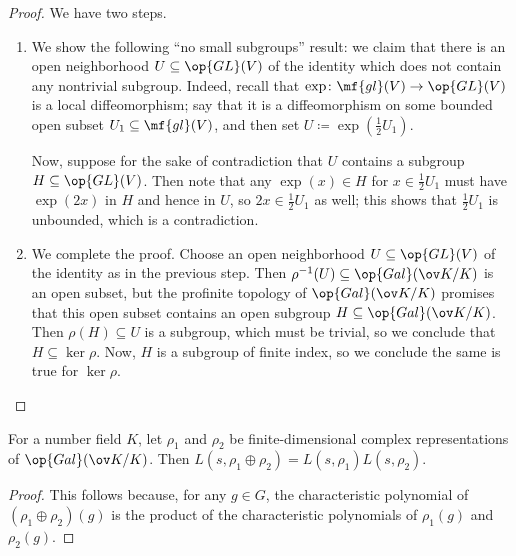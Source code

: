\documentclass[../thesis.tex]{subfiles}
\begin{document}
\begin{proof}
	We have two steps.
	\begin{enumerate}
		\item We show the following ``no small subgroups'' result: we claim that there is an open neighborhood $U\subseteq\op{GL}(V)$ of the identity which does not contain any nontrivial subgroup. Indeed, recall that $\exp\colon\mf{gl}(V)\to\op{GL}(V)$ is a local diffeomorphism; say that it is a diffeomorphism on some bounded open subset $U_1\subseteq\mf{gl}(V)$, and then set $U\coloneqq\exp\left(\frac12U_1\right)$.
		
		Now, suppose for the sake of contradiction that $U$ contains a subgroup $H\subseteq\op{GL}(V)$. Then note that any $\exp(x)\in H$ for $x\in\frac12U_1$ must have $\exp(2x)$ in $H$ and hence in $U$, so $2x\in\frac12U_1$ as well; this shows that $\frac12U_1$ is unbounded, which is a contradiction.

		\item We complete the proof. Choose an open neighborhood $U\subseteq\op{GL}(V)$ of the identity as in the previous step. Then $\rho^{-1}(U)\subseteq\op{Gal}(\ov K/K)$ is an open subset, but the profinite topology of $\op{Gal}(\ov K/K)$ promises that this open subset contains an open subgroup $H\subseteq\op{Gal}(\ov K/K)$. Then $\rho(H)\subseteq U$ is a subgroup, which must be trivial, so we conclude that $H\subseteq\ker\rho$. Now, $H$ is a subgroup of finite index, so we conclude the same is true for $\ker\rho$.
		\qedhere
	\end{enumerate}
\end{proof}
\begin{lemma}[additive] \label{lem:artin-add}
	For a number field $K$, let $\rho_1$ and $\rho_2$ be finite-dimensional complex representations of $\op{Gal}(\ov K/K)$. Then $L(s,\rho_1\oplus\rho_2)=L(s,\rho_1)L(s,\rho_2)$.
\end{lemma}
\begin{proof}
	This follows because, for any $g\in G$, the characteristic polynomial of $(\rho_1\oplus\rho_2)(g)$ is the product of the characteristic polynomials of $\rho_1(g)$ and $\rho_2(g)$.
\end{proof}
\end{document}
